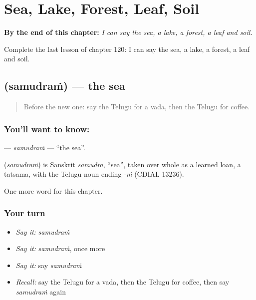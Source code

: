 
\chapter{Sea, Lake, Forest, Leaf, Soil}
\label{ch:te-sea-lake-forest-leaf-soil}

\begin{chapteropening}
\textbf{By the end of this chapter:} \emph{I can say the sea, a lake, a forest, a leaf and soil.}

Complete the last lesson of chapter 120: I can say the sea, a lake, a forest, a leaf and soil.
\end{chapteropening}

\section[\texorpdfstring{\te{సముద్రం} (samudraṁ)}{సముద్రం (samudraṁ)}]{ (samudraṁ) — the sea}

\label{lesson:TE-C120-samudram}



\begin{quote}
Before the new one: say the Telugu for a vada, then the Telugu for coffee.
\end{quote}

\subsection*{You'll want to know: }
\textbf{} — \emph{samudraṁ} — \textquotedblleft{}the sea\textquotedblright{}.

\begin{cousinweb}
\textbf{} (\emph{samudraṁ}) is Sanskrit \emph{samudra}, \textquotedblleft{}sea\textquotedblright{}, taken over whole as a learned loan, a tatsama, with the Telugu noun ending \emph{-ṁ} (CDIAL 13236).
\end{cousinweb}

\begin{grammarlens}[title={What you've built}]
One more word for this chapter.
\end{grammarlens}

\subsection*{Your turn}
\begin{itemize}
\raggedright
  \item \emph{Say it:} \emph{samudraṁ}
  \item \emph{Say it:} \emph{samudraṁ}, once more
  \item \emph{Say it:} say \emph{samudraṁ}
  \item \emph{Recall:} say the Telugu for a vada, then the Telugu for coffee, then say \emph{samudraṁ} again
\end{itemize}

